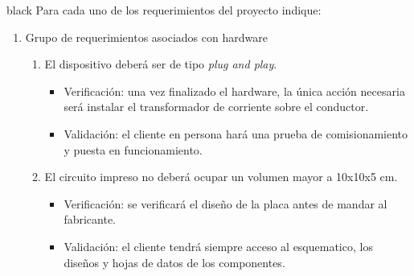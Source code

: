 \documentclass[11pt]{charter}
\begin{document}
\begin{consigna}{black}
Para cada uno de los requerimientos del proyecto indique:
\begin{enumerate}
	\item Grupo de requerimientos asociados con hardware
	\begin{enumerate}[label*=\arabic*.]
			\item El dispositivo deberá ser de tipo \textit{plug and play}.
				\begin{itemize}
					\item Verificación: una vez finalizado el hardware, la única acción necesaria será instalar el transformador de corriente sobre el conductor.\\
					\item Validación: el cliente en persona hará una prueba de comisionamiento y puesta en funcionamiento.\\
				\end{itemize}
				
			\item El circuito impreso no deberá ocupar un volumen mayor a 10x10x5 cm.
				\begin{itemize}
					\item Verificación: se verificará el diseño de la placa antes de mandar al fabricante.\\
					\item Validación: el cliente tendrá siempre acceso al esquematico, los diseños y hojas de datos de los componentes.\\
				\end{itemize}
				

\end{enumerate}
\end{enumerate}
\end{consigna}
\end{document}
